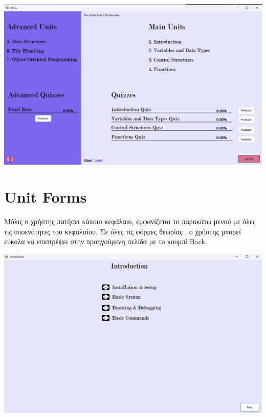 \documentclass[12pt]{article}
\newcommand{\en}[1]{\foreignlanguage{English}{#1}}
\begin{document}
\begin{center}
    
    \includegraphics[width=1\linewidth]{image.png}
\end{center}
\newpage
\section*{\en{Unit Forms}}
Μόλις ο χρήστης πατήσει κάποιο κεφάλαιο, εμφανίζεται το παρακάτω μενού με όλες τις υποενότητες του κεφαλαίου.
Σε όλες τις φόρμες θεωρίας , ο χρήστης μπορεί εύκολα να επιστρέψει στην προηγούμενη σελίδα με το κουμπί \en{Back}.
\begin{center}
    
    \includegraphics[width=1\linewidth]{unitmenu.png}
\end{center}
\end{document}

